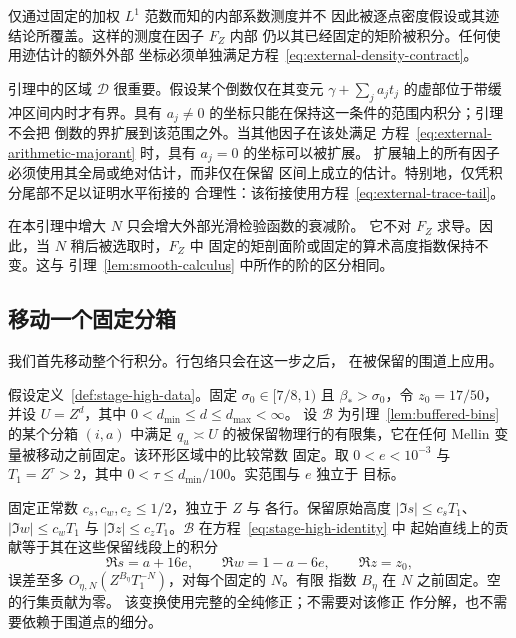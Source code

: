 仅通过固定的加权 $L^1$ 范数而知的内部系数测度并不
因此被逐点密度假设或其迹结论所覆盖。这样的测度在因子 $F_Z$ 内部
仍以其已经固定的矩阶被积分。任何使用迹估计的额外外部
坐标必须单独满足方程~\eqref{eq:external-density-contract}。

引理中的区域 $\mathcal D$ 很重要。假设某个倒数仅在其变元
$\gamma+\sum_j a_jt_j$ 的虚部位于带缓冲区间内时才有界。具有
$a_j\ne0$ 的坐标只能在保持这一条件的范围内积分；引理不会把
倒数的界扩展到该范围之外。当其他因子在该处满足
方程~\eqref{eq:external-arithmetic-majorant} 时，具有 $a_j=0$ 的坐标可以被扩展。
扩展轴上的所有因子必须使用其全局或绝对估计，而非仅在保留
区间上成立的估计。特别地，仅凭积分尾部不足以证明水平衔接的
合理性：该衔接使用方程~\eqref{eq:external-trace-tail}。

在本引理中增大 $N$ 只会增大外部光滑检验函数的衰减阶。
它不对 $F_Z$ 求导。因此，当 $N$ 稍后被选取时，$F_Z$ 中
固定的矩剖面阶或固定的算术高度指数保持不变。这与
引理~\ref{lem:smooth-calculus} 中所作的阶的区分相同。

\subsection{移动一个固定分箱}

我们首先移动整个行积分。行包络只会在这一步之后，
在被保留的围道上应用。

\begin{lemma}[固定分箱的围道变换]
\label{lem:fixed-bin-contour}
假设定义~\ref{def:stage-high-data}。固定
$\sigma_0\in[7/8,1)$ 且 $\beta_*>\sigma_0$，令 $z_0=17/50$，并设
$U=Z^d$，其中 $0<d_{\min}\le d\le d_{\max}<\infty$。
设 $\mathcal B$ 为引理~\ref{lem:buffered-bins} 的某个分箱 $(i,a)$ 中满足 $q_u\asymp U$
的被保留物理行的有限集，它在任何
Mellin 变量被移动之前固定。该环形区域中的比较常数
固定。取 $0<e<10^{-3}$ 与 $T_1=Z^\tau>2$，其中
$0<\tau\le d_{\min}/100$。实范围与 $e$ 独立于
目标。

固定正常数 $c_s,c_w,c_z\le1/2$，独立于 $Z$ 与
各行。保留原始高度
$|\Im s|\le c_sT_1$、$|\Im w|\le c_wT_1$ 与
$|\Im z|\le c_zT_1$。$\mathcal B$ 在方程~\eqref{eq:stage-high-identity} 中
起始直线上的贡献等于其在这些保留线段上的积分
\begin{equation}
 \Re s=a+16e,\qquad \Re w=1-a-6e,\qquad \Re z=z_0,
 \label{eq:stage-central-contours}
\end{equation}
误差至多 $O_{\eta,N}(Z^{B_\eta}T_1^{-N})$，对每个固定的 $N$。有限
指数 $B_\eta$ 在 $N$ 之前固定。空的行集贡献为零。
该变换使用完整的全纯修正；不需要对该修正
作分解，也不需要依赖于围道点的细分。
\end{lemma}

